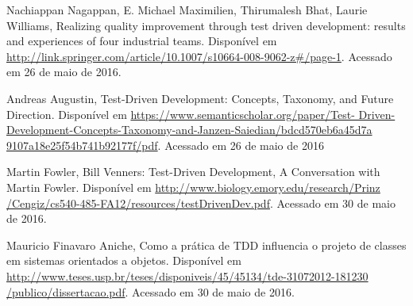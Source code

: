 \documentclass{article}
\begin{document}
  \begin{flushleft}
  Nachiappan Nagappan, E. Michael Maximilien, Thirumalesh Bhat,
  Laurie Williams, Realizing quality improvement through test driven 
  development: results and experiences of four industrial teams. Disponível em
  \url{http://link.springer.com/article/10.1007/s10664-008-9062-z#/page-1}.
  Acessado em 26 de maio de 2016.

  Andreas Augustin, Test-Driven Development: Concepts, Taxonomy, and Future 
  Direction. Disponível em \url{https://www.semanticscholar.org/paper/Test-
  Driven-Development-Concepts-Taxonomy-and-Janzen-Saiedian/bdcd570eb6a45d7a
  9107a18e25f54b741b92177f/pdf}. Acessado em 26 de maio de 2016

  Martin Fowler, Bill Venners: Test-Driven Development, A Conversation with 
  Martin Fowler. Disponível em \url{http://www.biology.emory.edu/research/Prinz
  /Cengiz/cs540-485-FA12/resources/testDrivenDev.pdf}. Acessado em 30 de maio de
  2016.

  Mauricio Finavaro Aniche, Como a prática de TDD influencia o projeto de 
  classes em sistemas orientados a objetos. Disponível em 
  \url{http://www.teses.usp.br/teses/disponiveis/45/45134/tde-31072012-181230
  /publico/dissertacao.pdf}. Acessado em 30 de maio de 2016.
  \end{flushleft}
\end{document}
